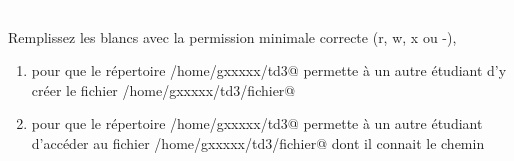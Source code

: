 \documentclass[11pt,a4paper]{article}
\begin{document}
                \textcolor{white}{.} \par
            Remplissez les blancs avec la permission minimale correcte (r, w, x ou -),
					\begin{enumerate}
				
			\item 
									pour que le r\'epertoire \verb@/home/gxxxxx/td3@ 
									permette \`a un autre \'etudiant d'y cr\'eer le fichier  
									\verb@/home/gxxxxx/td3/fichier@\par
				 \textcolor{gray}{\underline{\hspace*{1em}}}  \textcolor{gray}{\underline{\hspace*{1em}}}  \textcolor{gray}{\underline{\hspace*{1em}}}  \textcolor{gray}{\underline{\hspace*{1em}}}  \textcolor{gray}{\underline{\hspace*{1em}}}  \textcolor{gray}{\underline{\hspace*{1em}}}  \textcolor{gray}{\underline{\hspace*{1em}}}  \textcolor{gray}{\underline{\hspace*{1em}}}  \textcolor{gray}{\underline{\hspace*{1em}}} 
			\item 
									pour que le r\'epertoire \verb@/home/gxxxxx/td3@ 
									permette \`a un autre \'etudiant d'acc\'eder au fichier  
									\verb@/home/gxxxxx/td3/fichier@
									dont il connait le chemin
									\par
				 \textcolor{gray}{\underline{\hspace*{1em}}}  \textcolor{gray}{\underline{\hspace*{1em}}}  \textcolor{gray}{\underline{\hspace*{1em}}}  \textcolor{gray}{\underline{\hspace*{1em}}}  \textcolor{gray}{\underline{\hspace*{1em}}}  \textcolor{gray}{\underline{\hspace*{1em}}}  \textcolor{gray}{\underline{\hspace*{1em}}}  \textcolor{gray}{\underline{\hspace*{1em}}}  \textcolor{gray}{\underline{\hspace*{1em}}} 
					\end{enumerate}
				
			
		\subparagraph{} 
		
\end{document}
